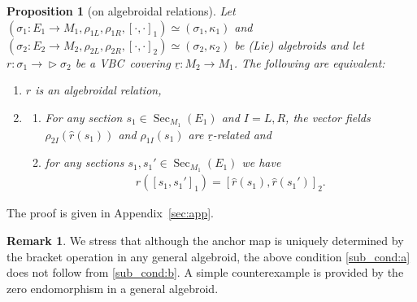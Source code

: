 \documentclass[pdftex]{sigma}
\newcommand{\ZM}{{VBC}} %
\newcommand{\und}{\underline}
\newcommand{\Sec}{\operatorname{Sec}}
\newcommand{\ra}{\rightarrow}
\def\relto{\rightarrow\!\!\vartriangleright} %
\numberwithin{equation}{section}
\newtheorem{prop}[thm]{Proposition}
\theoremstyle{definition}
\newtheorem{rem}[thm]{Remark}
\begin{document}
\begin{prop}[on algebroidal relations]\label{prop:algebroidal_relation} Let $(\sigma_1\colon E_1\ra M_1,\rho_{1L}, \rho_{1R},[\cdot,\cdot]_1)\simeq(\sigma_1,\kappa_1)$ and $(\sigma_2\colon E_2\ra M_2,\rho_{2L}, \rho_{2R},[\cdot,\cdot]_2)\simeq(\sigma_2,\kappa_2)$ be (Lie) algebroids and let $r\colon \sigma_1\relto \sigma_2$ be a \ZM\ covering $\und{r}\colon M_2\ra M_1$.
The following are equivalent:
\begin{enumerate}[$(i)$]\itemsep=0pt
\item\label{cond:alg_rel_1} $r$ is an algebroidal relation,
\item\label{cond:alg_rel_2}\begin{enumerate}[$(a)$]\itemsep=0pt
\item\label{sub_cond:a} For any section $s_1\in\Sec_{M_1}(E_1)$ and $I=L,R$, the vector fields $\rho_{2I} (\hat{r}(s_1))$ and $\rho_{1I}(s_1)$ are $\und{r}$-related and
\item\label{sub_cond:b} for any sections $s_1, s_1'\in \Sec_{M_1}(E_1)$ we have \begin{gather*} \hat{r}([s_1, s_1']_1) = [\hat{r}(s_1), \hat{r}(s_1')]_{2}.\end{gather*}
\end{enumerate}
\end{enumerate}
\end{prop}
The proof is given in Appendix~\ref{sec:app}.
\begin{rem} We stress that although the anchor map is uniquely determined by the bracket operation in any general algebroid, the above condition \eqref{sub_cond:a} does not follow from \eqref{sub_cond:b}. A simple counterexample is provided by the zero endomorphism in a general algebroid.
\end{rem}
\end{document}
